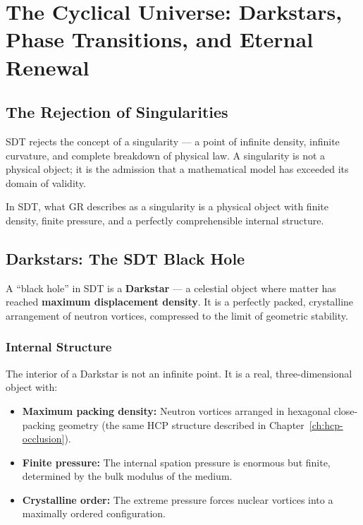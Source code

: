 
\chapter{The Cyclical Universe: Darkstars, Phase Transitions, and Eternal Renewal}
\label{ch:cyclical-universe}


\section{The Rejection of Singularities}

SDT rejects the concept of a singularity --- a point of infinite density, infinite curvature, and complete breakdown of physical law.  A singularity is not a physical object; it is the admission that a mathematical model has exceeded its domain of validity.

In SDT, what GR describes as a singularity is a physical object with finite density, finite pressure, and a perfectly comprehensible internal structure.


\section{Darkstars: The SDT Black Hole}

A ``black hole'' in SDT is a \textbf{Darkstar} --- a celestial object where matter has reached \textbf{maximum displacement density}.  It is a perfectly packed, crystalline arrangement of neutron vortices, compressed to the limit of geometric stability.

\subsection{Internal Structure}

The interior of a Darkstar is not an infinite point.  It is a real, three-dimensional object with:
\begin{itemize}
  \item \textbf{Maximum packing density:} Neutron vortices arranged in hexagonal close-packing geometry (the same HCP structure described in Chapter~\ref{ch:hcp-occlusion}).
  \item \textbf{Finite pressure:} The internal spation pressure is enormous but finite, determined by the bulk modulus of the medium.
  \item \textbf{Crystalline order:} The extreme pressure forces nuclear vortices into a maximally ordered configuration.
\end{itemize}

